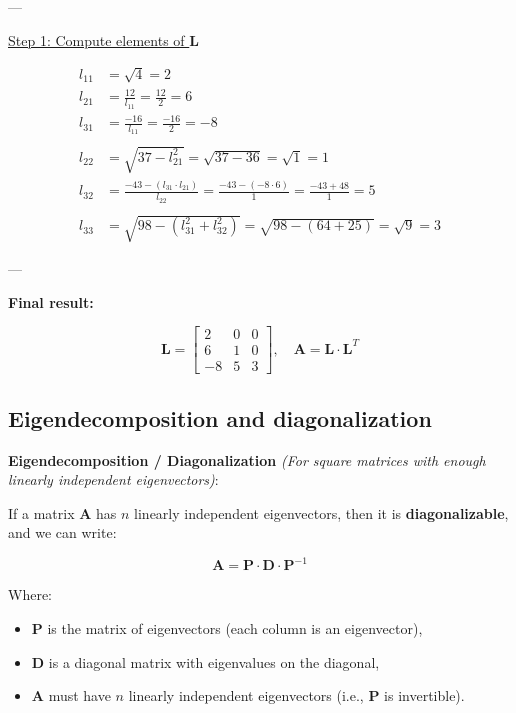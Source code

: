 ---

\underline{Step 1: Compute elements of \(\textbf{L}\)}

\begin{align*}
l_{11} &= \sqrt{4} = 2 \\
l_{21} &= \frac{12}{l_{11}} = \frac{12}{2} = 6 \\
l_{31} &= \frac{-16}{l_{11}} = \frac{-16}{2} = -8 \\
\\
l_{22} &= \sqrt{37 - l_{21}^2} = \sqrt{37 - 36} = \sqrt{1} = 1 \\
l_{32} &= \frac{-43 - (l_{31} \cdot l_{21})}{l_{22}} = \frac{-43 - (-8 \cdot 6)}{1} = \frac{-43 + 48}{1} = 5 \\
\\
l_{33} &= \sqrt{98 - (l_{31}^2 + l_{32}^2)} = \sqrt{98 - (64 + 25)} = \sqrt{9} = 3
\end{align*}

---

\textbf{Final result:}

\[
\textbf{L} =
\begin{bmatrix}
2 & 0 & 0 \\
6 & 1 & 0 \\
-8 & 5 & 3
\end{bmatrix},
\quad
\textbf{A} = \textbf{L} \cdot \textbf{L}^T
\]


\subsection{Eigendecomposition and diagonalization}

\textbf{Eigendecomposition / Diagonalization} \textit{(For square matrices with enough linearly independent eigenvectors)}:

If a matrix \(\textbf{A}\) has \(n\) linearly independent eigenvectors, then it is \textbf{diagonalizable}, and we can write:

\[
\textbf{A} = \textbf{P} \cdot \textbf{D} \cdot \textbf{P}^{-1}
\]

Where:
\begin{itemize}
    \item \(\textbf{P}\) is the matrix of eigenvectors (each column is an eigenvector),
    \item \(\textbf{D}\) is a diagonal matrix with eigenvalues on the diagonal,
    \item \(\textbf{A}\) must have \(n\) linearly independent eigenvectors (i.e., \(\textbf{P}\) is invertible).
\end{itemize}

